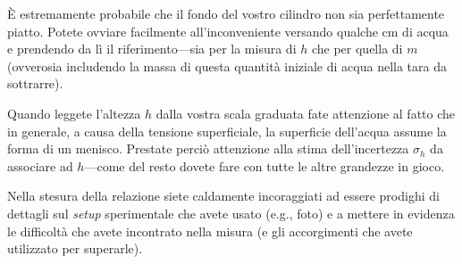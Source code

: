 \documentclass{lab1-article}
\begin{document}
\begin{article}
\`E estremamente probabile che il fondo del vostro cilindro non sia perfettamente
piatto. Potete ovviare facilmente all'inconveniente versando qualche cm di
acqua e prendendo da l\`i il riferimento---sia per la misura di $h$ che per
quella di $m$ (ovverosia includendo la massa di questa quantit\`a iniziale di
acqua nella tara da sottrarre).

Quando leggete l'altezza $h$ dalla vostra scala graduata fate attenzione al
fatto che in generale, a causa della tensione superficiale, la superficie
dell'acqua assume la forma di un menisco. Prestate perci\`o attenzione alla stima
dell'incertezza $\sigma_h$ da associare ad $h$---come del resto dovete fare con
tutte le altre grandezze in gioco.

Nella stesura della relazione siete caldamente incoraggiati ad essere prodighi
di dettagli sul \emph{setup} sperimentale che avete usato (e.g., foto) e a
mettere in evidenza le difficolt\`a che avete incontrato nella misura
(e gli accorgimenti che avete utilizzato per superarle).

\onecolumn




\end{article}
\end{document}
